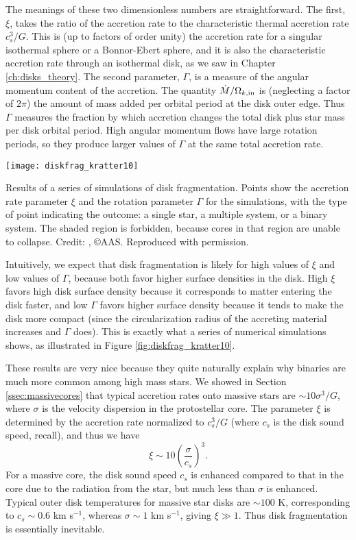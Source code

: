The meanings of these two dimensionless numbers are straightforward. The first, $\xi$, takes the ratio of the accretion rate to the characteristic thermal accretion rate $c_s^3/G$. This is (up to factors of order unity) the accretion rate for a singular isothermal sphere or a Bonnor-Ebert sphere, and it is also the characteristic accretion rate through an isothermal disk, as we saw in Chapter \ref{ch:disks_theory}. The second parameter, $\Gamma$, is a measure of the angular momentum content of the accretion. The quantity $\dot{M}/\Omega_{k,\rm in}$ is (neglecting a factor of $2\pi$) the amount of mass added per orbital period at the disk outer edge. Thus $\Gamma$ measures the fraction by which accretion changes the total disk plus star mass per disk orbital period. High angular momentum flows have large rotation periods, so they produce larger values of $\Gamma$ at the same total accretion rate.
\begin{marginfigure}
\texttt{[image: diskfrag\_kratter10]}
\caption[Parameter study of disk fragmentation]{
\label{fig:diskfrag_kratter10}
Results of a series of simulations of disk fragmentation. Points show the accretion rate parameter $\xi$ and the rotation parameter $\Gamma$ for the simulations, with the type of point indicating the outcome: a single star, a multiple system, or a binary system. The shaded region is forbidden, because cores in that region are unable to collapse. Credit: \citet{kratter10a}, \copyright AAS. Reproduced with permission.
}
\end{marginfigure}

Intuitively, we expect that disk fragmentation is likely for high values of $\xi$ and low values of $\Gamma$, because both favor higher surface densities in the disk. High $\xi$ favors high disk surface density because it corresponds to matter entering the disk faster, and low $\Gamma$ favors higher surface density because it tends to make the disk more compact (since the circularization radius of the accreting material increases and $\Gamma$ does). This is exactly what a series of numerical simulations shows, as illustrated in Figure \ref{fig:diskfrag_kratter10}.

These results are very nice because they quite naturally explain why binaries are much more common among high mass stars. We showed in Section \ref{ssec:massivecores} that typical accretion rates onto massive stars are $\sim 10 \sigma^3/G$, where $\sigma$ is the velocity dispersion in the protostellar core. The parameter $\xi$ is determined by the accretion rate normalized to $c_s^3/G$ (where $c_s$ is the disk sound speed, recall), and thus we have
\begin{equation}
\xi \sim 10\left(\frac{\sigma}{c_s}\right)^3.
\end{equation}
For a massive core, the disk sound speed $c_s$ is enhanced compared to that in the core due to the radiation from the star, but much less than $\sigma$ is enhanced. Typical outer disk temperatures for massive star disks are $\sim 100$ K, corresponding to $c_s \sim 0.6$ km s$^{-1}$, whereas $\sigma \sim 1$ km s$^{-1}$, giving $\xi \gg 1$. Thus disk fragmentation is essentially inevitable.

